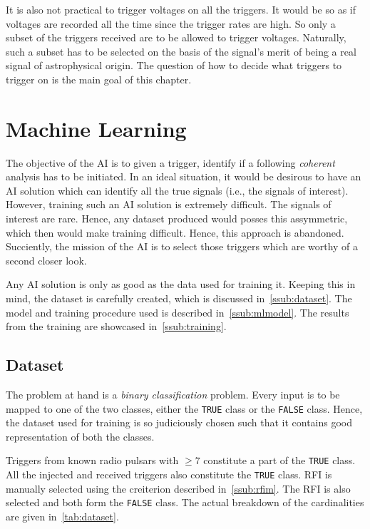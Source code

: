 \par It is also not practical to trigger voltages on all the triggers. It would be so as if voltages are recorded all the time since the trigger rates are high.
So only a subset of the triggers received are to be allowed to trigger voltages. 
Naturally, such a subset has to be selected on the basis of the signal's merit of being a real signal of astrophysical origin.
The question of how to decide what triggers to trigger on is the main goal of this chapter.

\section {Machine Learning}
\label{sec:ml}

\par The objective of the AI is to given a trigger, identify if a following \emph{coherent} analysis has to be initiated.
In an ideal situation, it would be desirous to have an AI solution which can identify all the true signals (i.e., the signals of interest).
However, training such an AI solution is extremely difficult.
The signals of interest are rare. Hence, any dataset produced would posses this assymmetric, which then would make training difficult.
Hence, this approach is abandoned. 
Succiently, the mission of the AI is to select those triggers which are worthy of a second closer look.

\par Any AI solution is only as good as the data used for training it. Keeping this in mind, the dataset is carefully created, which is discussed in~\autoref{ssub:dataset}. The model and training procedure used is described in~\autoref{ssub:mlmodel}.
The results from the training are showcased in~\autoref{ssub:training}.

\subsection{Dataset}

\label{ssub:dataset}

\par The problem at hand is a \emph{binary classification} problem. 
Every input is to be mapped to one of the two classes, either the \texttt{TRUE} class or the \texttt{FALSE} class.
Hence, the dataset used for training is so judiciously chosen such that it contains good representation of both the classes.

\par Triggers from known radio pulsars with \sn $\geq 7$ constitute a part of the \texttt{TRUE} class.
All the injected and received triggers also constitute the \texttt{TRUE} class.
RFI is manually selected using the creiterion described in~\autoref{ssub:rfim}.
The  RFI is also selected and both form the \texttt{FALSE} class.
The actual breakdown of the cardinalities are given in~\autoref{tab:dataset}.

